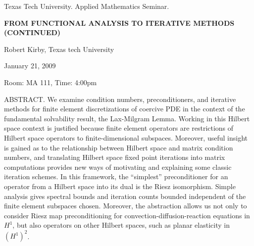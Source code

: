 \documentclass[oneside]{amsart}
\begin{document}
\begin{center}
Texas Tech University. Applied Mathematics Seminar.

\end{center}

\begin{center}

{\LARGE \uppercase{\textbf{
From functional analysis to iterative methods (continued)
}}}

Robert Kirby, Texas tech University

January 21, 2009

Room: MA 111, Time: 4:00pm

\end{center}

ABSTRACT. We examine condition numbers, preconditioners, and iterative methods
for finite element discretizations of coercive PDE in the context of
the fundamental solvability result, the Lax-Milgram Lemma.  Working in
this Hilbert space context is justified because finite element
operators are restrictions of Hilbert space operators to
finite-dimensional subspaces.  Moreover, useful insight is gained as
to the relationship between Hilbert space and matrix condition
numbers, and translating Hilbert space fixed point iterations into
matrix computations provides new ways of motivating and explaining
some classic iteration schemes.  In this framework, the ``simplest''
preconditioner for an operator from a Hilbert space into its dual is
the Riesz isomorphism.  Simple analysis gives spectral bounds and
iteration counts bounded independent of the finite element subspaces
chosen.  Moreover, the abstraction allows us not only to consider
Riesz map preconditioning for convection-diffusion-reaction equations
in $H^1$, but also operators on other Hilbert spaces, such as planar
elasticity in $\left(H^1\right)^2$.
\end{document}

